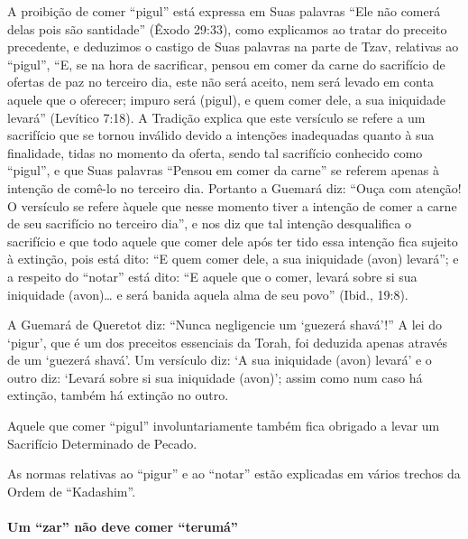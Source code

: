 A proibição de comer ``pigul'' está expressa em Suas palavras ``Ele não
comerá delas pois são santidade'' (Êxodo 29:33), como explicamos ao
tratar do preceito precedente, e deduzimos o castigo de Suas palavras
na parte de Tzav, relativas ao ``pigul'', ``E, se na hora de sacrificar,
pensou em comer da carne do sacrifício de ofertas de paz no terceiro
dia, este não será aceito, nem será levado em conta aquele que o
oferecer; impuro será (pigul), e quem comer dele, a sua iniquidade
levará'' (Levítico 7:18). A Tradição explica que este versículo se
refere a um sacrifício que se tornou inválido devido a intenções
inadequadas quanto à sua finalidade, tidas no momento da oferta, sendo
tal sacrifício conhecido como ``pigul'', e que Suas palavras ``Pensou em
comer da carne'' se referem apenas à intenção de comê-lo no terceiro
dia. Portanto a Guemará diz: ``Ouça com atenção! O versículo se refere
àquele que nesse momento tiver a intenção de comer a carne de seu
sacrifício no terceiro dia'', e nos diz que tal intenção desqualifica o
sacrifício e que todo aquele que comer dele após ter tido essa intenção
fica sujeito à extinção, pois está dito: ``E quem comer dele, a sua
iniquidade (avon) levará''; e a respeito do ``notar'' está dito: ``E
aquele que o comer, levará sobre si sua iniquidade (avon)\ldots{} e será
banida aquela alma de seu povo'' (Ibid., 19:8).

A Guemará de Queretot diz: ``Nunca negligencie um `guezerá shavá'!'' A
lei do `pigur', que é um dos preceitos essenciais da Torah, foi deduzida
apenas através de um `guezerá shavá'. Um versículo diz: `A sua
iniquidade (avon) levará' e o outro diz: `Levará sobre si sua iniquidade
(avon)'; assim como num caso há extinção, também há extinção no outro.

Aquele que comer ``pigul'' involuntariamente também fica obrigado a
levar um Sacrifício Determinado de Pecado.

As normas relativas ao ``pigur'' e ao ``notar'' estão explicadas em
vários trechos da Ordem de ``Kadashim''.

\paragraph{Um ``zar'' não deve comer ``terumá''}

